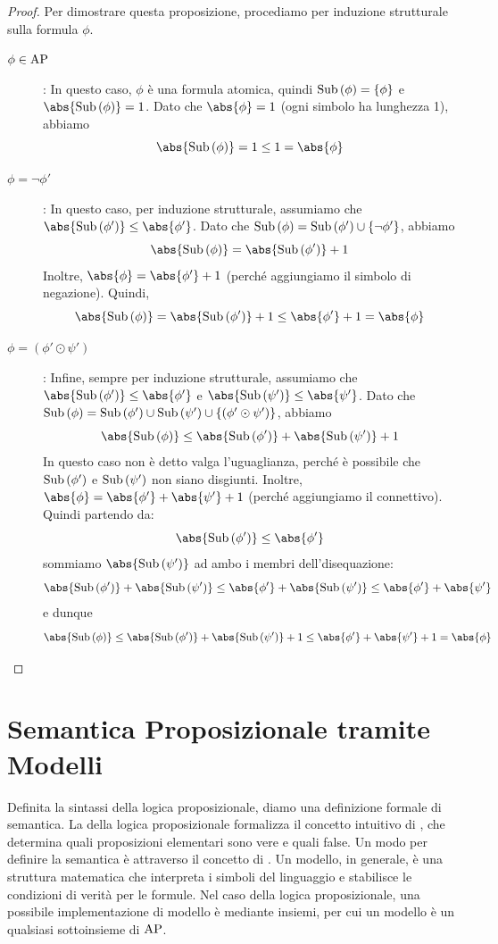 \begin{proof}
  Per dimostrare questa proposizione, procediamo per induzione strutturale sulla formula \(\phi\).
  \begin{description}
    \item[\(\phi \in \AP\)]: In questo caso, \(\phi\) è una formula atomica, quindi \(\operatorname{Sub}\left(\phi\right) = \{\phi\}\) e \(\abs{\Sub{\phi}} = 1\). Dato che \(\abs{\phi} = 1\) (ogni simbolo ha lunghezza 1), abbiamo
          \[\abs{\Sub{\phi}} = 1 \leq 1 = \abs{\phi}\]
    \item[\(\phi = \neg \phi'\)]: In questo caso, per induzione strutturale, assumiamo che \(\abs{\Sub{\phi'}} \leq \abs{\phi'}\). Dato che \(\operatorname{Sub}\left(\phi\right) = \operatorname{Sub}\left(\phi'\right) \cup \{\neg \phi'\}\), abbiamo
          \[\abs{\Sub{\phi}} = \abs{\Sub{\phi'}} + 1\]
          Inoltre, \(\abs{\phi} = \abs{\phi'} + 1\) (perché aggiungiamo il simbolo di negazione). Quindi,
          \[\abs{\Sub{\phi}} = \abs{\Sub{\phi'}} + 1 \leq \abs{\phi'} + 1 = \abs{\phi}\]
    \item[\(\phi = (\phi' \odot \psi')\)]: Infine, sempre per induzione strutturale, assumiamo che \(\abs{\Sub{\phi'}} \leq \abs{\phi'}\) e \(\abs{\Sub{\psi'}} \leq \abs{\psi'}\). Dato che \(\operatorname{Sub}\left(\phi\right) = \operatorname{Sub}\left(\phi'\right) \cup \operatorname{Sub}\left(\psi'\right) \cup \{(\phi' \odot \psi')\}\), abbiamo
          \[\abs{\Sub{\phi}} \leq \abs{\Sub{\phi'}} + \abs{\Sub{\psi'}} + 1\]
          In questo caso non è detto valga l'uguaglianza, perché è possibile che \(\operatorname{Sub}\left(\phi'\right)\) e \(\operatorname{Sub}\left(\psi'\right)\) non siano disgiunti.
          Inoltre, \(\abs{\phi} = \abs{\phi'} + \abs{\psi'} + 1\) (perché aggiungiamo il connettivo). Quindi partendo da:
          \[\abs{\Sub{\phi'}} \leq \abs{\phi'}\]
          sommiamo \(\abs{\Sub{\psi'}}\) ad ambo i membri dell'disequazione:
          \[\abs{\Sub{\phi'}} +\abs{\Sub{\psi'}} \leq \abs{\phi'} + \abs{\Sub{\psi'}} \leq \abs{\phi'} + \abs{\psi'}\]
          e dunque
          \[\abs{\Sub{\phi}} \leq \abs{\Sub{\phi'}} + \abs{\Sub{\psi'}} + 1 \leq \abs{\phi'} + \abs{\psi'} + 1 = \abs{\phi}\]
  \end{description}
\end{proof}

\section{Semantica Proposizionale tramite Modelli}

Definita la sintassi della logica proposizionale, diamo una definizione formale di semantica. La  della logica proposizionale formalizza il concetto intuitivo di , che determina quali proposizioni elementari sono vere e quali false.
Un modo per definire la semantica è attraverso il concetto di .
Un modello, in generale, è una struttura matematica che interpreta i simboli del linguaggio e stabilisce le condizioni di verità per le formule.
Nel caso della logica proposizionale, una possibile implementazione di modello è mediante insiemi, per cui un modello è un qualsiasi sottoinsieme di \(\AP\).

